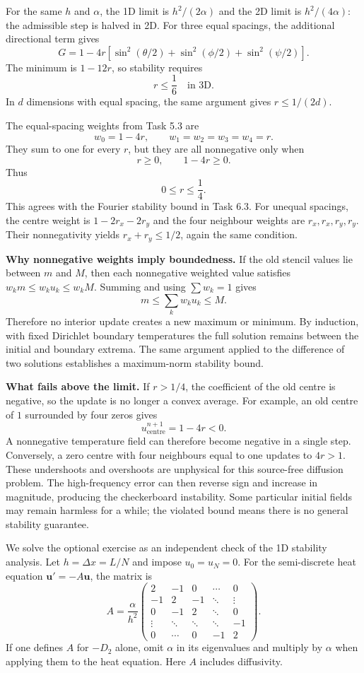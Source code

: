 For the same $h$ and $\alpha$, the 1D limit is $h^2/(2\alpha)$ and the 2D limit is
$h^2/(4\alpha)$: the admissible step is halved in 2D.
For three equal spacings, the additional directional term gives
\[
G=1-4r\left[\sin^2(\theta/2)+\sin^2(\phi/2)+\sin^2(\psi/2)\right].
\]
The minimum is $1-12r$, so stability requires
\[
\boxed{r\le\frac16\quad\text{in 3D}.}
\]
In $d$ dimensions with equal spacing, the same argument gives $r\le1/(2d)$.

The equal-spacing weights from Task 5.3 are
\[
w_0=1-4r,\qquad w_1=w_2=w_3=w_4=r.
\]
They sum to one for every $r$, but they are all nonnegative only when
\[
r\ge0,\qquad 1-4r\ge0.
\]
Thus
\[
\boxed{0\le r\le\frac14.}
\]
This agrees with the Fourier stability bound in Task 6.3. For unequal spacings, the centre
weight is $1-2r_x-2r_y$ and the four neighbour weights are $r_x,r_x,r_y,r_y$.
Their nonnegativity yields $r_x+r_y\le1/2$, again the same condition.

\textbf{Why nonnegative weights imply boundedness.}
If the old stencil values lie between $m$ and $M$, then each nonnegative weighted value satisfies
$w_km\le w_ku_k\le w_kM$. Summing and using $\sum w_k=1$ gives
\[
m\le\sum_k w_ku_k\le M.
\]
Therefore no interior update creates a new maximum or minimum. By induction, with fixed
Dirichlet boundary temperatures the full solution remains between the initial and boundary
extrema. The same argument applied to the difference of two solutions establishes a maximum-norm
stability bound.

\textbf{What fails above the limit.}
If $r>1/4$, the coefficient of the old centre is negative, so the update is no longer a convex
average. For example, an old centre of $1$ surrounded by four zeros gives
\[
u_{\mathrm{centre}}^{n+1}=1-4r<0.
\]
A nonnegative temperature field can therefore become negative in a single step. Conversely,
a zero centre with four neighbours equal to one updates to $4r>1$.
These undershoots and overshoots are unphysical for this source-free diffusion problem.
The high-frequency error can then reverse sign and increase in magnitude, producing the
checkerboard instability. Some particular initial fields may remain harmless for a while;
the violated bound means there is no general stability guarantee.

We solve the optional exercise as an independent check of the 1D stability analysis.
Let $h=\Delta x=L/N$ and impose $u_0=u_N=0$.
For the semi-discrete heat equation $\bm u'=-A\bm u$, the matrix is
\[
A=\frac{\alpha}{h^2}
\begin{pmatrix}
2&-1&0&\cdots&0\\
-1&2&-1&\ddots&\vdots\\
0&-1&2&\ddots&0\\
\vdots&\ddots&\ddots&\ddots&-1\\
0&\cdots&0&-1&2
\end{pmatrix}.
\]
If one defines $A$ for $-D_2$ alone, omit $\alpha$ in its eigenvalues and multiply by $\alpha$
when applying them to the heat equation. Here $A$ includes diffusivity.

